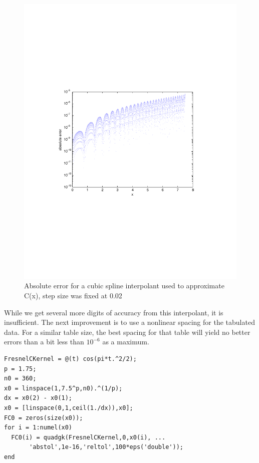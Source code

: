 \documentclass[a4paper,11pt]{article}
\begin{document}
\begin{figure}
\centering
    \includegraphics[width=5in]{cubicsplineerrors.pdf}
        \caption{Absolute error for a cubic spline interpolant used to approximate C(x), step size was fixed at 0.02}
\end{figure}

While we get several more digits of accuracy from this interpolant, it is insufficient. The next improvement is to use a nonlinear spacing for the tabulated data. For a similar table size, the best spacing for that table will yield no better errors than a bit less than $10^{-6}$ as a maximum.

\begin{lstlisting}
FresnelCKernel = @(t) cos(pi*t.^2/2);
p = 1.75;
n0 = 360;
x0 = linspace(1,7.5^p,n0).^(1/p);
dx = x0(2) - x0(1);
x0 = [linspace(0,1,ceil(1./dx)),x0];
FC0 = zeros(size(x0));
for i = 1:numel(x0)
  FC0(i) = quadgk(FresnelCKernel,0,x0(i), ...
       'abstol',1e-16,'reltol',100*eps('double'));
end
\end{lstlisting}
\end{document}
